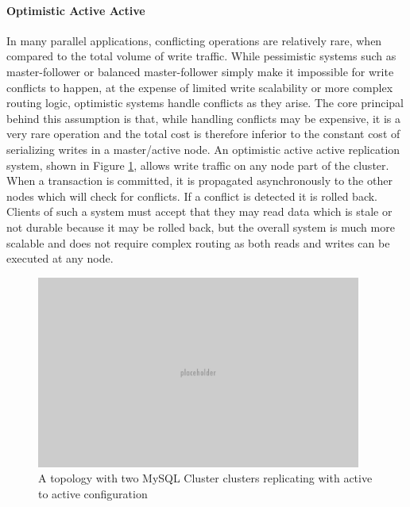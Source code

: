 \paragraph{Optimistic Active Active}
In many parallel applications, conflicting operations are relatively rare, when compared to the total volume of write traffic.
While pessimistic systems such as master-follower or balanced master-follower simply make it impossible for write conflicts to happen, at the expense of limited write scalability or more complex routing logic, optimistic systems handle conflicts as they arise.
The core principal behind this assumption is that, while handling conflicts may be expensive, it is a very rare operation and the total cost is therefore inferior to the constant cost of serializing writes in a master/active node.
An optimistic active active replication system, shown in Figure \ref{fig:optimistic-active-active}, allows write traffic on any node part of the cluster.
When a transaction is committed, it is propagated asynchronously to the other nodes which will check for conflicts. If a conflict is detected it is rolled back.
Clients of such a system must accept that they may read data which is stale or not durable because it may be rolled back, but the overall system is much more scalable and does not require complex routing as both reads and writes can be executed at any node.

\begin{figure}[h]
\caption{A topology with two MySQL Cluster clusters replicating with active to active configuration}
\label{fig:optimistic-active-active}
\centering
\includegraphics[width=0.95\textwidth]{images/placeholder.png}
\end{figure}

